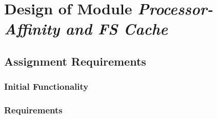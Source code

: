 
\chapter{Design of Module \textit{Processor-Affinity and FS Cache}}

\section{Assignment Requirements}


\subsection{Initial Functionality}


\subsection{Requirements}


